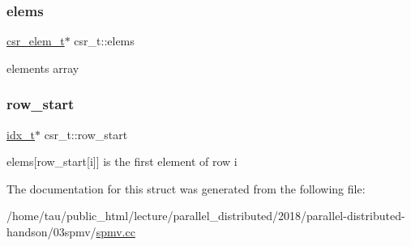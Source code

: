 \subsubsection{\texorpdfstring{elems}{elems}}
{\footnotesize\ttfamily \hyperlink{structcsr__elem__t}{csr\+\_\+elem\+\_\+t}$\ast$ csr\+\_\+t\+::elems}

elements array \mbox{\label{structcsr__t_ac52d7a1ff3a054e2b8c7fcc706e525b6}} 
\subsubsection{\texorpdfstring{row\+\_\+start}{row\_start}}
{\footnotesize\ttfamily \hyperlink{spmv_8cc_a8e93478a00e685bea5e6a3f617bf03a3}{idx\+\_\+t}$\ast$ csr\+\_\+t\+::row\+\_\+start}

elems\mbox{[}row\+\_\+start\mbox{[}i\mbox{]}\mbox{]} is the first element of row i 

The documentation for this struct was generated from the following file\+:\begin{DoxyCompactItemize}
\item 
/home/tau/public\+\_\+html/lecture/parallel\+\_\+distributed/2018/parallel-\/distributed-\/handson/03spmv/\hyperlink{spmv_8cc}{spmv.\+cc}\end{DoxyCompactItemize}
